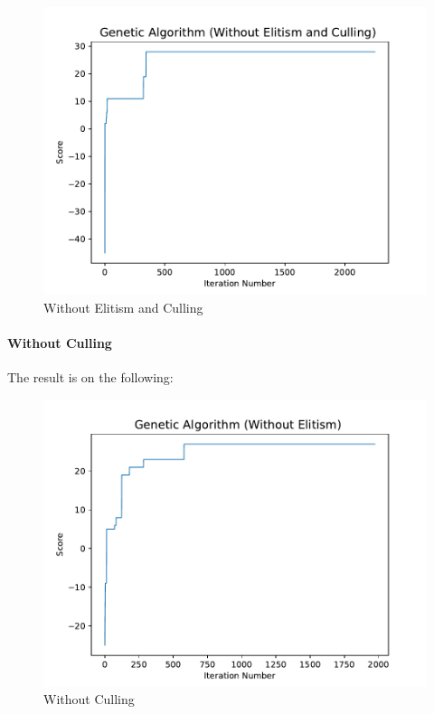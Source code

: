 \documentclass[11pt, a4paper]{article}
\begin{document}
\newpage
\begin{figure}[htbp]
	\centering 
	\includegraphics[scale=0.35]{up3_1}
	\caption{Without Elitism and Culling} %
\end{figure}


\paragraph{Without Culling}

The result is on the following:

\begin{figure}[htbp]
	\centering 
	\includegraphics[scale=0.35]{up3_2}
	\caption{Without Culling} %
\end{figure}
\end{document}
